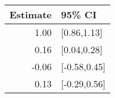 \begin{tabular}{rl}
  \hline
Estimate & 95\% CI \\ 
  \hline
1.00 & [0.86,1.13] \\ 
  0.16 & [0.04,0.28] \\ 
  -0.06 & [-0.58,0.45] \\ 
  0.13 & [-0.29,0.56] \\ 
   \hline
\end{tabular}

